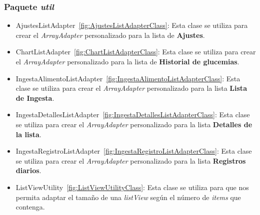 \subsubsection{Paquete \textit{util}}
\begin{itemize}
	\item AjustesListAdapter~\ref{fig:AjustesListAdapterClass}: Esta clase se utiliza para crear el \textit{ArrayAdapter} personalizado para la lista de \textbf{Ajustes}.
	\item ChartListAdapter~\ref{fig:ChartListAdapterClass}: Esta clase se utiliza para crear el \textit{ArrayAdapter} personalizado para la lista de \textbf{Historial de glucemias}.
	\item IngestaAlimentoListAdapter~\ref{fig:IngestaAlimentoListAdapterClass}: Esta clase se utiliza para crear el \textit{ArrayAdapter} personalizado para la lista \textbf{Lista de Ingesta}.
	\item IngestaDetallesListAdapter~\ref{fig:IngestaDetallesListAdapterClass}: Esta clase se utiliza para crear el \textit{ArrayAdapter} personalizado para la lista \textbf{Detalles de la lista}.
	\item IngestaRegistroListAdapter~\ref{fig:IngestaRegistroListAdapterClass}: Esta clase se utiliza para crear el \textit{ArrayAdapter} personalizado para la lista \textbf{Registros diarios}.
	\item ListViewUtility~\ref{fig:ListViewUtilityClass}: Esta clase se utiliza para que nos permita adaptar el tamaño de una \textit{listView} según el número de \textit{items} que contenga.
\end{itemize}

